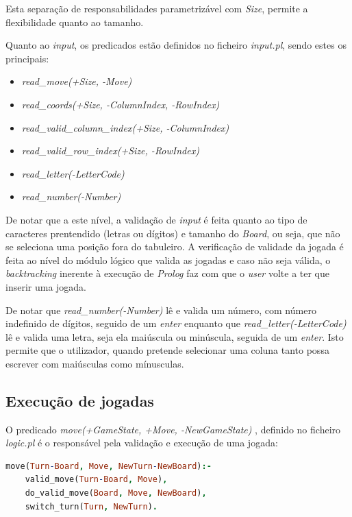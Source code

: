 \documentclass[a4paper,11pt,portuguese]{article}
\begin{document}
    \noindent Esta separação de responsabilidades parametrizável com \textit{Size}, permite
    a flexibilidade quanto ao tamanho.

    \noindent Quanto ao \textit{input}, os predicados estão definidos no ficheiro \textit{input.pl},
    sendo estes os principais:

    \begin{itemize}[topsep=4pt,itemsep=2pt]
        \item \textit{read\_move(+Size, -Move) }
        \item \textit{read\_coords(+Size, -ColumnIndex, -RowIndex) }
        \item \textit{read\_valid\_column\_index(+Size, -ColumnIndex) }
        \item \textit{read\_valid\_row\_index(+Size, -RowIndex) }
        \item \textit{read\_letter(-LetterCode) }
        \item \textit{read\_number(-Number) }
    \end{itemize}
    
    \noindent De notar que a este nível, a validação de \textit{input} é feita quanto
    ao tipo de caracteres prentendido (letras ou dígitos) e tamanho do \textit{Board},
    ou seja, que não se seleciona uma posição fora do tabuleiro. A verificação de
    validade da jogada é feita ao nível do módulo lógico que valida as jogadas e caso
    não seja válida, o \textit{backtracking} inerente à execução de \textit{Prolog}
    faz com que o \textit{user} volte a ter que inserir uma jogada.

    De notar que \textit{read\_number(-Number)} lê e valida um número, com número
    indefinido de dígitos, seguido de um \textit{enter} enquanto que
    \textit{read\_letter(-LetterCode)} lê e valida uma letra, seja ela maiúscula
    ou minúscula, seguida de um \textit{enter}. Isto permite que o utilizador,
    quando pretende selecionar uma coluna tanto possa escrever com maiúsculas
    como mínusculas.

    \subsection{Execução de jogadas}

    O predicado \textit{move(+GameState, +Move, -NewGameState)} , definido no ficheiro
    \textit{logic.pl} é o responsável pela validação e execução de uma jogada:

\begin{lstlisting}[language=prolog]
% move(+GameState, +Move, -NewGameState)
move(Turn-Board, Move, NewTurn-NewBoard):-
    valid_move(Turn-Board, Move),
    do_valid_move(Board, Move, NewBoard),
    switch_turn(Turn, NewTurn).
\end{lstlisting}
\end{document}

